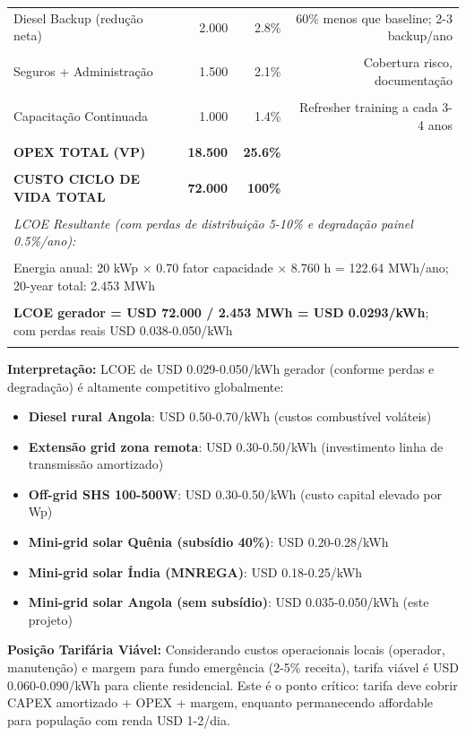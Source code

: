 \documentclass[12pt, a4paper]{article}
\begin{document}
\begin{table}[H]
\begin{tabular}{|l|r|r|r|}
Diesel Backup (redução neta) & 2.000 & 2.8\% & 60\% menos que baseline; 2-3 backup/ano \\\\
Seguros + Administração & 1.500 & 2.1\% & Cobertura risco, documentação \\\\
Capacitação Continuada & 1.000 & 1.4\% & Refresher training a cada 3-4 anos \\\\
\hline\textbf{OPEX TOTAL (VP)} &\textbf{18.500} &\textbf{25.6\%} & \\\\
\hline\textbf{CUSTO CICLO DE VIDA TOTAL} &\textbf{72.000} &\textbf{100\%} & \\\\
\hline
\multicolumn{4}{|l|}{\small\textit{LCOE Resultante (com perdas de distribuição 5-10\% e degradação painel 0.5\%/ano):}} \\\\
\multicolumn{4}{|l|}{\small Energia anual: 20 kWp × 0.70 fator capacidade × 8.760 h = 122.64 MWh/ano; 20-year total: 2.453 MWh} \\\\
\multicolumn{4}{|l|}{\small\textbf{LCOE gerador = USD 72.000 / 2.453 MWh = USD 0.0293/kWh}; com perdas reais USD 0.038-0.050/kWh} \\\\
\hline
\end{tabular}
\end{table}\textbf{Interpretação:} LCOE de USD 0.029-0.050/kWh gerador (conforme perdas e degradação) é altamente competitivo globalmente:
\begin{itemize}
\item\textbf{Diesel rural Angola}: USD 0.50-0.70/kWh (custos combustível voláteis)
\item\textbf{Extensão grid zona remota}: USD 0.30-0.50/kWh (investimento linha de transmissão amortizado)
\item\textbf{Off-grid SHS 100-500W}: USD 0.30-0.50/kWh (custo capital elevado por Wp)
\item\textbf{Mini-grid solar Quênia (subsídio 40\%)}: USD 0.20-0.28/kWh
\item\textbf{Mini-grid solar Índia (MNREGA)}: USD 0.18-0.25/kWh
\item\textbf{Mini-grid solar Angola (sem subsídio)}: USD 0.035-0.050/kWh (este projeto)
\end{itemize}\textbf{Posição Tarifária Viável:} Considerando custos operacionais locais (operador, manutenção) e margem para fundo emergência (2-5\% receita), tarifa viável é USD 0.060-0.090/kWh para cliente residencial. Este é o ponto crítico: tarifa deve cobrir CAPEX amortizado + OPEX + margem, enquanto permanecendo affordable para população com renda USD 1-2/dia.
\end{document}
